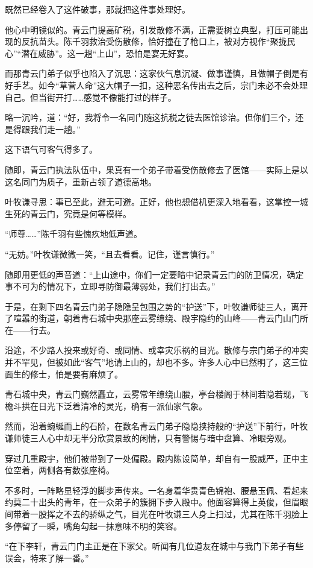既然已经卷入了这件破事，那就把这件事处理好。

他心中明镜似的。青云门提高矿税，引发散修不满，正需要树立典型，打压可能出现的反抗苗头。陈千羽救治受伤散修，恰好撞在了枪口上，被对方视作“聚拢民心”“潜在威胁”。这一趟“上山”，恐怕是宴无好宴。

而那青云门弟子似乎也陷入了沉思：这家伙气息沉凝、做事谨慎，且做帽子倒是有好手艺。如今“草菅人命”这大帽子一扣，这种恶名传出去之后，宗门未必不会处理自己。但当街开打……感觉不像能打过的样子。

略一沉吟，道：“好，我将令一名同门随这抗税之徒去医馆诊治。但你们三个，还是得跟我们走一趟。”

这下语气可客气得多了。

随即，青云门执法队伍中，果真有一个弟子带着受伤散修去了医馆——实际上是以这名同门为质子，重新占领了道德高地。

叶牧谦寻思：事已至此，避无可避。正好，他也想借机更深入地看看，这掌控一城生死的青云门，究竟是何等模样。

“师尊……”陈千羽有些愧疚地低声道。

“无妨。”叶牧谦微微一笑，“且去看看。记住，谨言慎行。”

随即用更低的声音道：“上山途中，你们一定要暗中记录青云门的防卫情况，确定事不可为的情况下，立即寻防御最薄弱处，我们打出去。”

于是，在剩下四名青云门弟子隐隐呈包围之势的“护送”下，叶牧谦师徒三人，离开了喧嚣的街道，朝着青石城中央那座云雾缭绕、殿宇隐约的山峰——青云门山门所在——行去。

沿途，不少路人投来或好奇、或同情、或幸灾乐祸的目光。散修与宗门弟子的冲突并不罕见，但被如此“客气”地请上山的，却也不多。许多人心中已然明了，这三位面生的修士，怕是要有麻烦了。

青石城中央，青云门巍然矗立，云雾常年缭绕山腰，亭台楼阁于林间若隐若现，飞檐斗拱在日光下泛着清冷的灵光，确有一派仙家气象。

然而，沿着蜿蜒而上的石阶，在数名青云门弟子隐隐挟持般的“护送”下前行，叶牧谦师徒三人心中却无半分欣赏景致的闲情，只有警惕与暗中盘算、冷眼旁观。

穿过几重殿宇，他们被带到了一处偏殿。殿内陈设简单，却自有一股威严，正中主位空着，两侧各有数张座椅。

不多时，一阵略显轻浮的脚步声传来。一名身着华贵青色锦袍、腰悬玉佩、看起来约莫二十出头的青年，在一众弟子的簇拥下步入殿中。他面容算得上英俊，但眉眼间带着一股挥之不去的骄纵之气，目光在叶牧谦三人身上扫过，尤其在陈千羽脸上多停留了一瞬，嘴角勾起一抹意味不明的笑容。

“在下李轩，青云门门主正是在下家父。听闻有几位道友在城中与我门下弟子有些误会，特来了解一番。”

